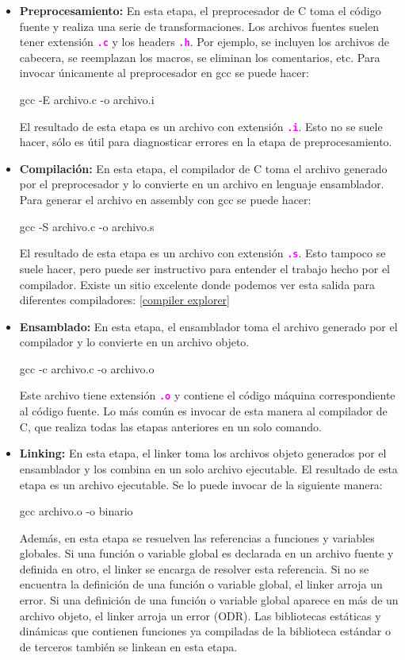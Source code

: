 \documentclass[]{scrartcl}
\newcommand{\hl}[1]{\textcolor{magenta}{\textbf{\texttt{#1}}}}
\begin{document}
\begin{itemize}
  \item \textbf{Preprocesamiento:} En esta etapa, el preprocesador de C toma el código fuente y realiza una serie de transformaciones. Los archivos fuentes suelen tener extensión \hl{.c} y los headers \hl{.h}. Por ejemplo, se incluyen los archivos de cabecera, se reemplazan los macros, se eliminan los comentarios, etc. Para invocar únicamente al preprocesador en gcc se puede hacer:
  \begin{bashbox}
    gcc -E archivo.c -o archivo.i
  \end{bashbox}  
  El resultado de esta etapa es un archivo con extensión \hl{.i}. Esto no se suele hacer, sólo es útil para diagnosticar errores en la etapa de preprocesamiento.
  \item \textbf{Compilación:} En esta etapa, el compilador de C toma el archivo generado por el preprocesador y lo convierte en un archivo en lenguaje ensamblador. Para generar el archivo en assembly con gcc se puede hacer:
  \begin{bashbox}
    gcc -S archivo.c -o archivo.s
  \end{bashbox}
  El resultado de esta etapa es un archivo con extensión \hl{.s}. Esto tampoco se suele hacer, pero puede ser instructivo para entender el trabajo hecho por el compilador. Existe un sitio excelente donde podemos ver esta salida para diferentes compiladores: \href{https://godbolt.org/}{[compiler explorer]}
  \item \textbf{Ensamblado:} En esta etapa, el ensamblador toma el archivo generado por el compilador y lo convierte en un archivo objeto. 
  \begin{bashbox}
    gcc -c archivo.c -o archivo.o
  \end{bashbox}
  Este archivo tiene extensión \hl{.o} y contiene el código máquina correspondiente al código fuente. Lo más común es invocar de esta manera al compilador de C, que realiza todas las etapas anteriores en un solo comando.
  \item \textbf{Linking:} En esta etapa, el linker toma los archivos objeto generados por el ensamblador y los combina en un solo archivo ejecutable. El resultado de esta etapa es un archivo ejecutable. Se lo puede invocar de la siguiente manera:
  \begin{bashbox}
    gcc archivo.o -o binario
  \end{bashbox}
  Además, en esta etapa se resuelven las referencias a funciones y variables globales. Si una función o variable global es declarada en un archivo fuente y definida en otro, el linker se encarga de resolver esta referencia. Si no se encuentra la definición de una función o variable global, el linker arroja un error. Si una definición de una función o variable global aparece en más de un archivo objeto, el linker arroja un error (ODR). Las bibliotecas estáticas y dinámicas que contienen funciones ya compiladas de la biblioteca estándar o de terceros también se linkean en esta etapa.
\end{itemize}
\end{document}
